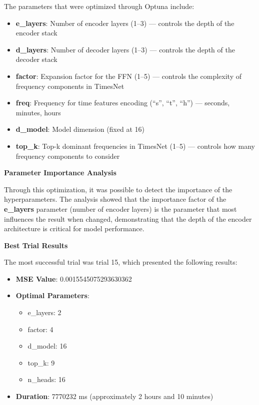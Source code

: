 The parameters that were optimized through Optuna include:

\begin{itemize}
    \item \textbf{e\_layers}: Number of encoder layers (1--3) --- controls the depth of the encoder stack
    \item \textbf{d\_layers}: Number of decoder layers (1--3) --- controls the depth of the decoder stack  
    \item \textbf{factor}: Expansion factor for the FFN (1--5) --- controls the complexity of frequency components in TimesNet
    \item \textbf{freq}: Frequency for time features encoding (``s'', ``t'', ``h'') --- seconds, minutes, hours
    \item \textbf{d\_model}: Model dimension (fixed at 16)
    \item \textbf{top\_k}: Top-k dominant frequencies in TimesNet (1--5) --- controls how many frequency components to consider
\end{itemize}

\textbf{Parameter Importance Analysis}

Through this optimization, it was possible to detect the importance of the hyperparameters. The analysis showed that the importance factor of the \textbf{e\_layers} parameter (number of encoder layers) is the parameter that most influences the result when changed, demonstrating that the depth of the encoder architecture is critical for model performance.

\textbf{Best Trial Results}
\label{subsec:best_trial_results}

The most successful trial was trial 15, which presented the following results:

\begin{itemize}
    \item \textbf{MSE Value}: 0.0015545075293630362
    \item \textbf{Optimal Parameters}:
    \begin{itemize}
        \item e\_layers: 2
        \item factor: 4  
        \item d\_model: 16
        \item top\_k: 9
        \item n\_heads: 16
    \end{itemize}
    \item \textbf{Duration}: 7770232 ms (approximately 2 hours and 10 minutes)
\end{itemize}

